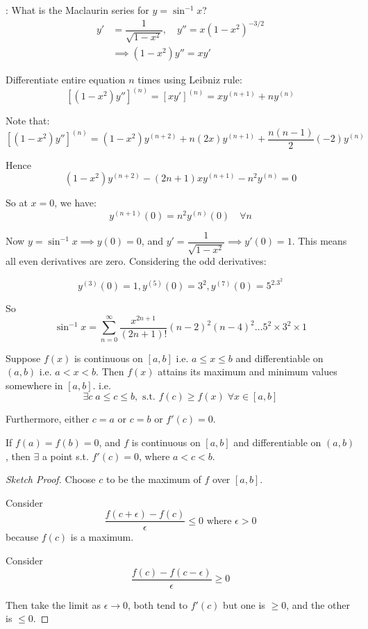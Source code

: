 \documentclass[10pt]{scrartcl}
\begin{document}
\begin{example}: What is the Maclaurin series for $y = \sin^{-1}x$?
\[
\begin{aligned}
 y' &= \dfrac{1}{\sqrt{1-x^2}},\quad  y'' = x(1-x^2)^{-3/2}\\
&\implies (1-x^2)y'' = xy'
\end{aligned}
\]

Differentiate entire equation $n$ times using Leibniz rule:
\[\displaystyle{
[(1-x^2)y'']^{(n)} = [xy']^{(n)} = xy^{(n+1)} + ny^{(n)}
}\]

Note that:
\[\displaystyle{
[(1-x^2)y'']^{(n)} = (1-x^2)y^{(n+2)} + n(2x)y^{(n+1)} + \frac{n(n-1)}{2}(-2)y^{(n)}
}\]

Hence \[(1-x^2)y^{(n+2)} - (2n+1)xy^{(n+1)} - n^2y^{(n)} = 0\]

So at $x = 0$, we have:
\[y^{(n+1)}(0) = n^2y^{(n)}(0) \quad \forall n\]

Now $y = \sin^{-1}x \implies y(0) = 0$, and $y' = \dfrac{1}{\sqrt{1-x^2}} \implies y'(0) = 1$. This means all even derivatives are zero. Considering the odd derivatives:

\[y^{(3)}(0) = 1, y^{(5)}(0) = 3^2, y^{(7)}(0) = 5^2.3^2\]

So \[\displaystyle{
\sin^{-1}x = \sum_{n =0}^{\infty} \frac{x^{2n+1}}{(2n+1)!}(n-2)^2(n-4)^2 \dots 5^2 \times 3^2 \times 1 
}\]

\end{example}

\vspace*{5pt}

\begin{theorem}
Suppose  $f(x)$ is continuous on $[a,b]$ i.e. $a \leq x \leq b$ and differentiable on $(a,b)$ i.e. $a < x < b$. Then $f(x)$ attains its maximum and minimum values somewhere in $[a,b]$. i.e. 
\[\exists c \; a\leq c \leq b, \text{ s.t. } f(c) \geq f(x)\; \forall x \in [a,b]\]

Furthermore, either $c = a$ or $c = b$ or $f'(c) = 0$. 
\end{theorem}


\begin{theorem}
	If $f(a) = f(b) = 0$, and $f$ is continuous on $[a,b]$ and differentiable on $(a,b)$, then $\exists$ a point s.t. $f'(c) = 0$, where $a < c < b$. 
\end{theorem}

\begin{proof}[Sketch Proof]

Choose $c$ to be the maximum of $f$ over $[a,b]$. 

Consider 
\[\frac{f(c + \epsilon) - f(c)}{\epsilon} \leq 0 \text{ where } \epsilon > 0\]
because $f(c)$ is a maximum. 

Consider 
\[\frac{f(c) - f(c-\epsilon)}{\epsilon} \geq 0\]

Then take the limit as $\epsilon \to 0$, both tend to $f'(c)$ but one is $\geq 0$, and the other is $\leq 0$. 
\end{proof}\vspace*{5pt}
\end{document}
